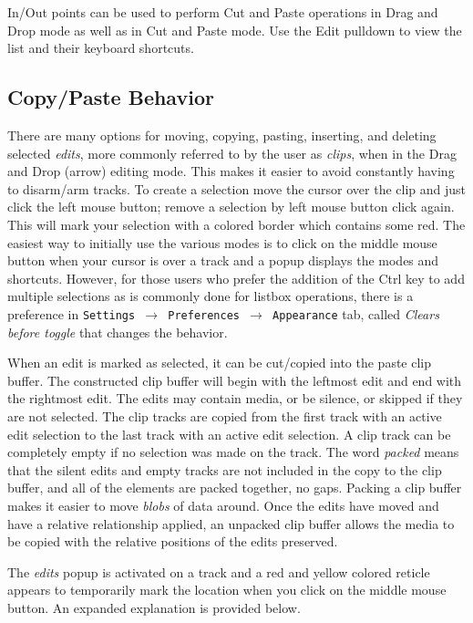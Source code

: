 In/Out points can be used to perform Cut and Paste operations in
Drag and Drop mode as well as in Cut and Paste mode.  Use the Edit
pulldown to view the list and their keyboard shortcuts.


\subsection{Copy/Paste Behavior}%
\label{sub:copy_paste_behavior}

There are many options for moving, copying, pasting, inserting, and
deleting selected \textit{edits}, more commonly referred to by the
user as \textit{clips}, when in the Drag and Drop (arrow) editing
mode.  This makes it easier to avoid constantly having to disarm/arm
tracks.  To create a selection move the cursor over the clip and
just click the left mouse button; remove a selection by left mouse
button click again.  This will mark your selection with a colored
border which contains some red.  The easiest way to initially use
the various modes is to click on the middle mouse button when your
cursor is over a track and a popup displays the modes and shortcuts.
However, for those users who prefer the addition of the Ctrl key to
add multiple selections as is commonly done for listbox operations,
there is a preference in \texttt{Settings $\rightarrow$ Preferences
  $\rightarrow$ Appearance} tab, called \textit{Clears before
  toggle} that changes the behavior.

When an edit is marked as selected, it can be cut/copied into the
paste clip buffer.  The constructed clip buffer will begin with the
leftmost edit and end with the rightmost edit.  The edits may
contain media, or be silence, or skipped if they are not selected.
The clip tracks are copied from the first track with an active edit
selection to the last track with an active edit selection.  A clip
track can be completely empty if no selection was made on the track.
The word \textit{packed} means that the silent edits and empty
tracks are not included in the copy to the clip buffer, and all of
the elements are packed together, no gaps.  Packing a clip buffer
makes it easier to move \textit{blobs} of data around.  Once the
edits have moved and have a relative relationship applied, an
unpacked clip buffer allows the media to be copied with the relative
positions of the edits preserved.

The \textit{edits} popup is activated on a track and a red and
yellow colored reticle appears to temporarily mark the location when
you click on the middle mouse button.  An expanded explanation is
provided below.

